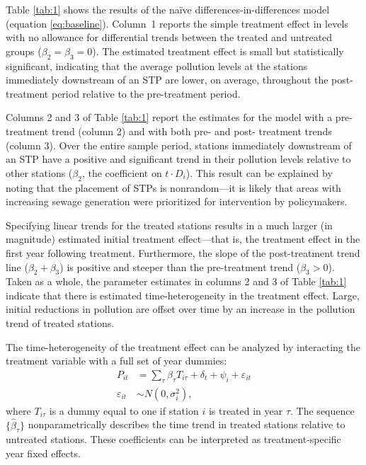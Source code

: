 \documentclass[12pt]{article}
\newcommand{\e}{\varepsilon}
\newcommand{\anum}[1]{\begin{align}#1\end{align}}
\newcommand{\did}{differences-in-differences }
\begin{document}
Table \ref{tab:1} shows the results of the na\"{i}ve \did model (equation \eqref{eq:baseline}). \mbox{Column 1} reports the simple treatment effect in levels with no allowance for differential trends between the treated and untreated groups ($\beta_2 = \beta_3 = 0$). The estimated treatment effect is small but statistically significant, indicating that the average pollution levels at the stations immediately downstream of an STP are lower, on average, throughout the post-treatment period relative to the pre-treatment period.

Columns 2 and 3 of Table \ref{tab:1} report the estimates for the model with a pre-treatment trend (column 2) and with both pre- and post- treatment trends (column 3). Over the entire sample period, stations immediately downstream of an STP have a positive and significant trend in their pollution levels relative to other stations ($\beta_2$, the coefficient on $t\cdot D_i$). This result can be explained by noting that the placement of STPs is nonrandom---it is likely that areas with increasing sewage generation were prioritized for intervention by policymakers. 

Specifying linear trends for the treated stations results in a much larger (in magnitude) estimated initial treatment effect---that is, the treatment effect in the first year following treatment. Furthermore, the slope of the post-treatment trend line ($\beta_2 + \beta_3$) is positive and steeper than the pre-treatment trend ($\beta_3 > 0$). Taken as a whole, the parameter estimates in columns 2 and 3 of Table \ref{tab:1} indicate that there is estimated time-heterogeneity in the treatment effect. Large, initial reductions in pollution are offset over time by an increase in the pollution trend of treated stations. 

The time-heterogeneity of the treatment effect can be analyzed by interacting the treatment variable with a full set of year dummies:
\anum{
	P_{it} &= \sum_{\tau} \beta_\tau T_{i\tau} + \delta_t + \psi_i + \e_{it}\label{eq:hettime} \\
	\e_{it} &\sim N(0, \sigma^2_i), \nonumber
}
where $T_{i\tau}$ is a dummy equal to one if station $i$ is treated in year $\tau$. The sequence $\{\hat{\beta}_\tau\}$ nonparametrically describes the time trend in treated stations relative to untreated stations. These coefficients can be interpreted as treatment-specific year fixed effects. 
\end{document}
